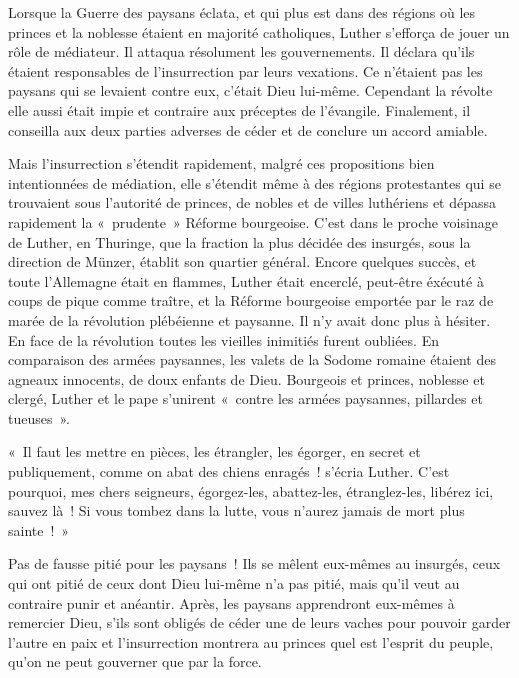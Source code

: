\documentclass[french,twoside]{book} %
\newenvironment{quoteblock}%
  {\begin{quoting}}
  {\end{quoting}}
\newenvironment{quotebar}{%
    \def\FrameCommand{{\color{rubric!10!}\vrule width 0.5em} \hspace{0.9em}}%
    \def\OuterFrameSep{\itemsep} %
    \MakeFramed {\advance\hsize-\width \FrameRestore}
  }%
  {%
    \endMakeFramed
  }
\renewenvironment{quoteblock}%
  {%
    \savenotes
    \setstretch{0.9}
    \begin{quotebar}
  }
  {%
    \end{quotebar}
    \spewnotes
  }
\begin{document}
Lorsque la Guerre des paysans éclata, et qui plus est dans des régions où les princes et la noblesse étaient en majorité catholiques, Luther s’efforça de jouer un rôle de médiateur. Il attaqua résolument les gouvernements. Il déclara qu’ils étaient responsables de l’insurrection par leurs vexations. Ce n’étaient pas les paysans qui se levaient contre eux, c’était Dieu lui-même. Cependant la révolte elle aussi était impie et contraire aux préceptes de l’évangile. Finalement, il conseilla aux deux parties adverses de céder et de conclure un accord amiable.\par
Mais l’insurrection s’étendit rapidement, malgré ces propositions bien intentionnées de médiation, elle s’étendit même à des régions protestantes qui se trouvaient sous l’autorité de princes, de nobles et de villes luthériens et dépassa rapidement la « prudente » Réforme bourgeoise. C’est dans le proche voisinage de Luther, en Thuringe, que la fraction la plus décidée des insurgés, sous la direction de Münzer, établit son quartier général. Encore quelques succès, et toute l’Allemagne était en flammes, Luther était encerclé, peut-être éxécuté à coups de pique comme traître, et la Réforme bourgeoise emportée par le raz de marée de la révolution plébéienne et paysanne. Il n’y avait donc plus à hésiter. En face de la révolution toutes les vieilles inimitiés furent oubliées. En comparaison des armées paysannes, les valets de la Sodome romaine étaient des agneaux innocents, de doux enfants de Dieu. Bourgeois et princes, noblesse et clergé, Luther et le pape s’unirent « contre les armées paysannes, pillardes et tueuses ».\par

\begin{quoteblock}
 \noindent « Il faut les mettre en pièces, les étrangler, les égorger, en secret et publiquement, comme on abat des chiens enragés ! s’écria Luther. C’est pourquoi, mes chers seigneurs, égorgez-les, abattez-les, étranglez-les, libérez ici, sauvez là ! Si vous tombez dans la lutte, vous n’aurez jamais de mort plus sainte ! »
\end{quoteblock}

\noindent Pas de fausse pitié pour les paysans ! Ils se mêlent eux-mêmes au insurgés, ceux qui ont pitié de ceux dont Dieu lui-même n’a pas pitié, mais qu’il veut au contraire punir et anéantir. Après, les paysans apprendront eux-mêmes à remercier Dieu, s’ils sont obligés de céder une de leurs vaches pour pouvoir garder l’autre en paix et l’insurrection montrera au princes quel est l’esprit du peuple, qu’on ne peut gouverner que par la force.\par
\end{document}
